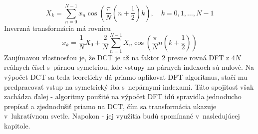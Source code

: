 \begin{equation}
    X_k = \sum_{n=0}^{N-1} x_n \cos \left(
            \frac{\pi}{N} (n + \frac{1}{2}) k\right),
    \quad k=0,1,\dots,N-1
    \label{eq:dct_transform}
\end{equation}
Inverzná transformácia má rovnicu
\begin{equation*}
    x_k = \frac{1}{N} X_0 + \frac{2}{N}\sum_{n=1}^{N-1} X_n 
            \cos\left(\frac{\pi}{N} n(k+\frac{1}{2})\right)
\end{equation*}
Zaujímavou vlastnosťou je, že DCT je až na faktor 2 presne rovná DFT z
$4N$ reálnych čísel s~párnou symetriou, kde vstupy na párnych indexoch
sú nulové. Na výpočet DCT sa teda teoreticky dá priamo aplikovať DFT
algoritmus, stačí mu predpracovať vstup na symetrický iba s~nepárnymi
indexami. Táto spojitosť však zachádza ďalej - algoritmy použité na
výpočet DFT idú spravidla jednoducho prepísať a zjednodušiť priamo na
DCT, čím sa transformácia ukazuje v~lukratívnom svetle. Napokon - jej
využitia budú spomínané v~nasledujúcej kapitole.

\nocite{wiki:laplace_transform}
\nocite{wiki:hartley_transform}
\nocite{wiki:z_transform}
\nocite{wiki:dct}
\nocite{bracewell}
\nocite{wolfram:z_transform}
